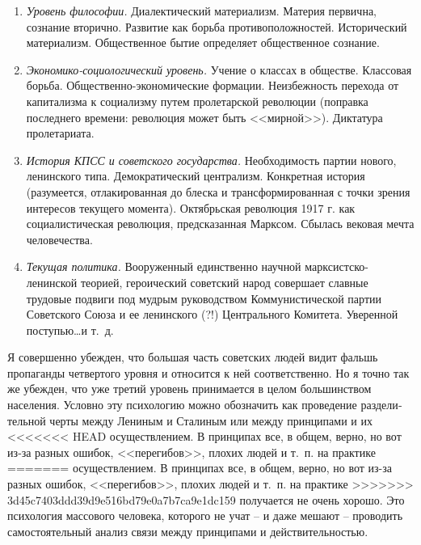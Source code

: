 \documentclass{book}
\begin{document}
\begin{enumerate}
 \item \textit{Уровень философии.}  Диалектический материализм. Материя первична, сознание вторично. Развитие как борьба 
 противоположностей. Исторический материализм. Общественное бытие определяет общественное сознание.
 \item \textit{Экономико-социологический уровень.}  Учение о классах в обществе. Классовая борьба. Общественно-экономические 
 формации. Неизбежность перехода от капитализма к социализму путем пролетарской революции (поправка последнего времени: 
 революция может быть <<мирной>>). Диктатура пролетариата.
 \item \textit{История КПСС и советского государства.} Необходимость партии нового, ленинского типа. Демократический централизм. 
 Конкретная история (разумеется, отлакированная до блеска и трансформированная с точки зрения интересов текущего момента). 
 Октябрьская революция 1917 г. как социалистиче­ская революция, предсказанная Марксом. Сбылась вековая мечта человечества.
 \item \textit{Текущая политика.}  Вооруженный единственно научной марксистско-ленинской теорией, героический советский народ 
 совершает славные трудовые подвиги под мудрым руководством Коммунистической партии Советского Союза и ее ленинского (?!) 
 Центрального Комитета. Уверенной поступью\ldots и т.~д.
\end{enumerate}

Я совершенно убежден, что большая часть советских людей видит фальшь пропаганды четвертого уровня и относится к ней 
соответственно. Но я точно так же убежден, что уже третий уровень принимается в целом большинством населения. Услов­но эту 
психологию можно обозначить как проведение раздели­тельной черты между Лениным и Сталиным или между прин­ципами и их 
<<<<<<< HEAD
осуществлением. В принципах все, в общем, верно, но вот из‑за разных ошибок, <<перегибов>>, плохих людей и т.~п. на практике 
=======
осуществлением. В принципах все, в общем, верно, но вот из-за разных ошибок, <<перегибов>>, плохих людей и т.~п. на практике 
>>>>>>> 3d45c7403ddd39d9e516bd79e0a7b7ca9e1dc159
получается не очень хорошо. Это психология массо­вого человека, которого не учат -- и даже мешают -- проводить самостоятельный 
анализ связи между принципами и действи­тельностью.
\end{document}

